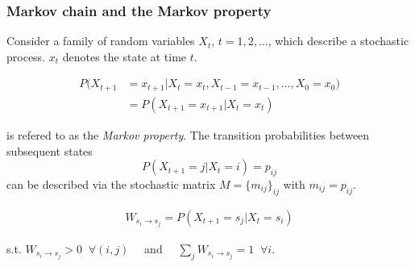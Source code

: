 \begin{frame} \frametitle{Markov chain and the Markov property}
Consider a family of random variables $X_t$, $t=1,2,\ldots$, which describe a stochastic process. $x_t$ denotes the state at time $t$.


\begin{align}
\label{eq:markovprop}
P(X_{t+1} &= x_{t+1} | X_{t} = x_{t}, X_{t-1} = x_{t-1}, \ldots, X_{0} = x_{0})\\
&= P(X_{t+1} = x_{t+1} | X_{t} = x_{t})
\end{align}

\notesonly{\eqref{eq:markovprop}}
 is refered to as the \emph{Markov property}. 
The transition probabilities between subsequent states
$$
P(X_{t+1}=j|X_{t}=i)=p_{ij}
$$
can be described via the stochastic matrix $M = \{m_{ij}\}_{ij}$ with
$m_{ij}=p_{ij}$. 
\\

\pause

\begin{align}
\label{eq:markovproptransition}
W_{s_i \rightarrow s_j} = P(X_{t+1} = s_j | X_{t} = s_i)
\end{align}

\begin{center}
s.t. $W_{s_i \rightarrow s_j} > 0 \;\;\forall (i,j)\quad$
and $\quad\sum_j W_{s_i \rightarrow s_j} = 1 \;\;\forall i$.

\end{center}
\end{frame}

